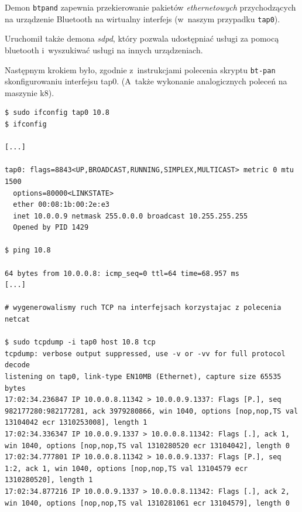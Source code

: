 Demon \texttt{btpand} zapewnia przekierowanie pakietów \emph{ethernetowych} przychodzących na urządzenie Bluetooth na wirtualny interfejs (w~naszym przypadku \texttt{tap0}).

Uruchomił także demona \emph{sdpd}, który pozwala udostępniać usługi za pomocą bluetooth i~wyszukiwać usługi na innych urządzeniach.

Następnym krokiem było, zgodnie z~instrukcjami polecenia skryptu \texttt{bt-pan} skonfigurowaniu interfejsu tap0.
(A~także wykonanie analogicznych poleceń na maszynie k8).

\begin{lstlisting}[caption={Skonfigurowanie interfejsów zgodnie z~protokołem IP}]
$ sudo ifconfig tap0 10.8
$ ifconfig

[...]

tap0: flags=8843<UP,BROADCAST,RUNNING,SIMPLEX,MULTICAST> metric 0 mtu 1500
  options=80000<LINKSTATE>
  ether 00:08:1b:00:2e:e3
  inet 10.0.0.9 netmask 255.0.0.0 broadcast 10.255.255.255
  Opened by PID 1429

$ ping 10.8

64 bytes from 10.0.0.8: icmp_seq=0 ttl=64 time=68.957 ms
[...]

# wygenerowalismy ruch TCP na interfejsach korzystajac z polecenia netcat

$ sudo tcpdump -i tap0 host 10.8 tcp
tcpdump: verbose output suppressed, use -v or -vv for full protocol decode
listening on tap0, link-type EN10MB (Ethernet), capture size 65535 bytes
17:02:34.236847 IP 10.0.0.8.11342 > 10.0.0.9.1337: Flags [P.], seq 982177280:982177281, ack 3979280866, win 1040, options [nop,nop,TS val 13104042 ecr 1310253008], length 1
17:02:34.336347 IP 10.0.0.9.1337 > 10.0.0.8.11342: Flags [.], ack 1, win 1040, options [nop,nop,TS val 1310280520 ecr 13104042], length 0
17:02:34.777801 IP 10.0.0.8.11342 > 10.0.0.9.1337: Flags [P.], seq 1:2, ack 1, win 1040, options [nop,nop,TS val 13104579 ecr 1310280520], length 1
17:02:34.877216 IP 10.0.0.9.1337 > 10.0.0.8.11342: Flags [.], ack 2, win 1040, options [nop,nop,TS val 1310281061 ecr 13104579], length 0

\end{lstlisting}

